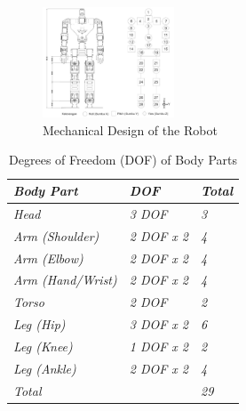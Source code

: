 \begin{enumerate}[label=\Alph*.]
    \begin{figure} [h] \centering
      \includegraphics[width=0.35\textwidth]{gambar/Desain_Mekanik.png}
      \caption{Mechanical Design of the Robot}
      \label{fig:Desain_Mekanik}
    \end{figure}

    \begin{table}[htb]
      \centering
      \caption{Degrees of Freedom (DOF) of Body Parts}
      \begin{tabular}{>{\itshape}l >{\itshape}l >{\itshape}l}
        \toprule
        \textit{Body Part} & \textit{DOF} & \textit{Total} \\
        \midrule
        Head & 3 DOF & 3 \\
        Arm (Shoulder) & 2 DOF x 2 & 4 \\
        Arm (Elbow) & 2 DOF x 2 & 4 \\
        Arm (Hand/Wrist) & 2 DOF x 2 & 4 \\
        Torso & 2 DOF & 2 \\
        Leg (Hip) & 3 DOF x 2 & 6 \\
        Leg (Knee) & 1 DOF x 2 & 2 \\
        Leg (Ankle) & 2 DOF x 2 & 4 \\
        \midrule
        Total & & 29 \\
        \bottomrule
      \end{tabular}
      \label{tab:DOF_Robot}
    \end{table}


\end{enumerate}

